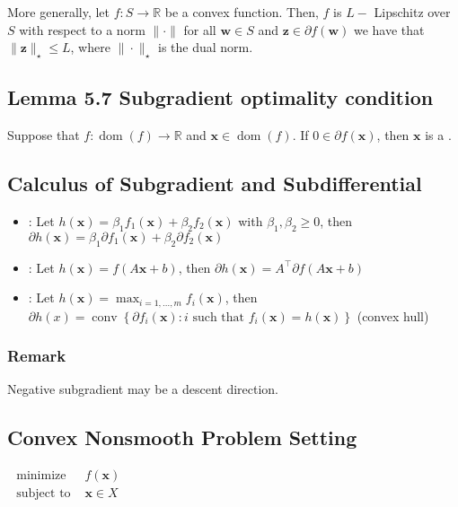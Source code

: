 More generally, let $f: S \rightarrow \mathbb{R}$ be a convex function. Then, $f$ is $L-$ Lipschitz over $S$ with respect to a norm $\|\cdot\|$  for all $\mathbf{w} \in S$ and $\mathbf{z} \in \partial f(\mathbf{w})$ we have that $\|\mathbf{z}\|_{\star} \leq L$, where $\|\cdot\|_{\star}$ is the dual norm.




\subsection*{Lemma 5.7 Subgradient optimality condition}
Suppose that $f: \operatorname{dom}(f) \rightarrow \mathbb{R}$ and $\mathbf{x} \in \operatorname{dom}(f)$. If $0 \in \partial f(\mathbf{x})$, then $\mathbf{x}$ is a .








\subsection*{Calculus of Subgradient and Subdifferential}
\begin{itemize}[leftmargin=*]
    \item {}: Let $h(\mathbf{x})=\beta_{1} f_{1}(\mathbf{x})+\beta_{2} f_{2}(\mathbf{x})$ with $\beta_{1}, \beta_{2} \geq 0$, then 
$
\partial h(\mathbf{x})=\beta_{1} \partial f_{1}(\mathbf{x})+\beta_{2} \partial f_{2}(\mathbf{x})
$
    \item {}: Let $h(\mathbf{x})=f(A \mathbf{x}+b)$, then 
$
\partial h(\mathbf{x})=A^{\top} \partial f(A \mathbf{x}+b)
$
    \item {}: Let $h(\mathbf{x})=\max _{i=1, \ldots, m} f_{i}(\mathbf{x})$, then
$
\partial h(x)=\operatorname{conv}\left\{\partial f_{i}(\mathbf{x}): i \text { such that } f_{i}(\mathbf{x})=h(\mathbf{x})\right\}
$ (convex hull)
\end{itemize}


\subsubsection*{Remark}
Negative subgradient may  be a descent direction.





\subsection*{Convex Nonsmooth Problem Setting}
$\begin{array}{cl}\text { minimize } & f(\mathbf{x}) \\ \text { subject to } & \mathbf{x} \in X\end{array}$

